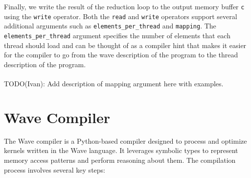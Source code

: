 \documentclass{article}
\begin{document}
Finally, we write the result of the reduction loop to the output memory buffer \texttt{c} using the \texttt{write} operator. Both the \texttt{read} and \texttt{write} operators
support several additional arguments such as \texttt{elements\_per\_thread} and \texttt{mapping}. The \texttt{elements\_per\_thread} argument specifies the number of elements
that each thread should load and can be thought of as a compiler hint that makes it easier for the compiler to go from the wave description of the program
to the thread description of the program.
\\ \\
TODO(Ivan): Add description of mapping argument here with examples.

\newpage

\section{Wave Compiler}
\label{section:wave_compiler}
The Wave compiler is a Python-based compiler designed to process and optimize kernels written in the Wave language. It leverages symbolic types to represent memory access patterns and perform reasoning about them. The compilation process involves several key steps:
\end{document}
